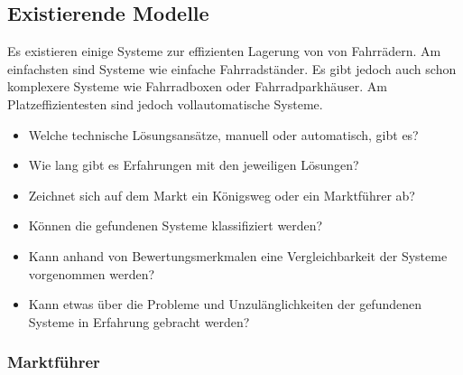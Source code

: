 \subsection{Existierende Modelle}

Es existieren einige Systeme zur effizienten Lagerung von von Fahrrädern. Am einfachsten sind Systeme wie einfache Fahrradständer. Es gibt jedoch auch schon komplexere Systeme wie Fahrradboxen oder Fahrradparkhäuser. Am Platzeffizientesten sind jedoch vollautomatische Systeme.

\begin{itemize}
  \item Welche technische Lösungsansätze, manuell oder automatisch, gibt es?
  \item Wie lang gibt es Erfahrungen mit den jeweiligen Lösungen?
  \item Zeichnet sich auf dem Markt ein Königsweg oder ein Marktführer ab?
  \item Können die gefundenen Systeme klassifiziert werden?
  \item Kann anhand von Bewertungsmerkmalen eine Vergleichbarkeit der Systeme vorgenommen werden?
  \item Kann etwas über die Probleme und Unzulänglichkeiten der gefundenen Systeme in Erfahrung gebracht werden?
\end{itemize}

\subsubsection{Marktführer}











